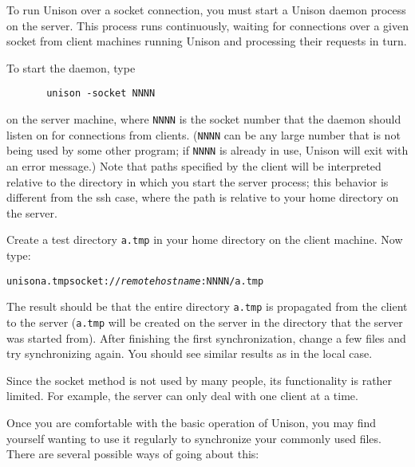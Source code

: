 \documentclass{article}
\newcommand{\NT}[1]{\textit{#1}}
\begin{document}
To run Unison over a socket connection, you must start a Unison
daemon process on the server.  This process runs continuously,
waiting for connections over a given socket from client machines
running Unison and processing their requests in turn.

To start the daemon, type
\begin{verbatim}
       unison -socket NNNN
\end{verbatim}
on the server machine, where {\tt NNNN} is the socket number that the
daemon should listen on for connections from clients.  ({\tt NNNN} can
be any large number that is not being used by some other program; if
\texttt{NNNN} is already in use, Unison will exit with an error
message.)  Note that paths specified by the client will be interpreted
relative to the directory in which you start the server process; this
behavior is different from the ssh case, where the path is relative to
your home directory on the server.

Create a test directory {\tt a.tmp} in your home directory on the
client machine.  Now type:
\begin{alltt}
       unison a.tmp socket://\NT{remotehostname}:NNNN/a.tmp
\end{alltt}
The result should be that the entire directory {\tt a.tmp} is
propagated from the client to the server (\texttt{a.tmp} will be
created on the server in the directory that the server was started
from).
%
After finishing the first synchronization, change a few files and try
synchronizing again.  You should see similar results as in the local
case.

Since the socket method is not used by many people, its functionality is
rather limited.  For example, the server can only deal with one client at a
time. 



Once you are comfortable with the basic operation of Unison, you may
find yourself wanting to use it regularly to synchronize your commonly
used files.  There are several possible ways of going about this:
\end{document}
